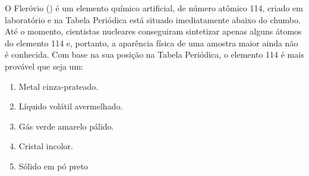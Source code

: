 O Fleróvio () é um elemento químico artificial, de número atômico 114, criado em laboratório e na Tabela Periódica está situado imediatamente abaixo do chumbo. Até o momento, cientistas nucleares conseguiram sintetizar apenas alguns átomos do elemento 114 e, portanto, a aparência física de uma amostra maior ainda não é conhecida. Com base na sua posição na Tabela Periódica, o elemento 114 é mais provável que seja um:

\begin{enumerate}[label = (\alph*)]
	\item Metal cinza-prateado. 
	\item Líquido volátil avermelhado. 
	\item Gás verde amarelo pálido.  
	\item Cristal incolor.
	\item Sólido em pó preto
\end{enumerate}